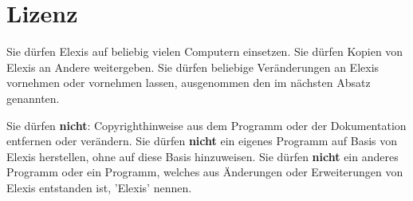\documentclass[paper=a4,BCOR8.25mm,twoside]{scrbook}
\begin{document}
\section{Lizenz}
Sie dürfen Elexis auf beliebig vielen Computern einsetzen. Sie dürfen Kopien von Elexis an Andere weitergeben. Sie dürfen beliebige Veränderungen an Elexis vornehmen oder vornehmen lassen, ausgenommen den im nächsten Absatz genannten.

\medskip

Sie dürfen \textbf{nicht}: Copyrighthinweise aus dem Programm oder der Dokumentation entfernen oder verändern. Sie dürfen \textbf{nicht} ein eigenes Programm auf Basis von Elexis herstellen, ohne auf diese Basis hinzuweisen. Sie dürfen \textbf{nicht} ein anderes Programm oder ein Programm, welches aus Änderungen oder Erweiterungen von Elexis entstanden ist, 'Elexis' nennen.
\end{document}
